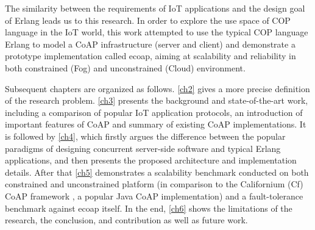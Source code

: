The similarity between the requirements of IoT applications and the design goal of Erlang leads us to this research. In order to explore the use space of COP language in the IoT world, this work attempted to use the typical COP language Erlang to model a CoAP infrastructure (server and client) and demonstrate a prototype implementation called ecoap, aiming at scalability and reliability in both constrained (Fog) and unconstrained (Cloud) environment.

Subsequent chapters are organized as follows. \autoref{ch2} gives a more precise definition of the research problem. \autoref{ch3} presents the background and state-of-the-art work, including a comparison of popular IoT application protocols, an introduction of important features of CoAP and summary of existing CoAP implementations. It is followed by \autoref{ch4}, which firstly argues the difference between the popular paradigms of designing concurrent server-side software and typical Erlang applications, and then presents the proposed architecture and implementation details. After that \autoref{ch5} demonstrates a scalability benchmark conducted on both constrained and unconstrained platform (in comparison to the Californium (Cf) CoAP framework \autocite{californium}, a popular Java CoAP implementation) and a fault-tolerance benchmark against ecoap itself. In the end, \autoref{ch6} shows the limitations of the research, the conclusion, and contribution as well as future work.





